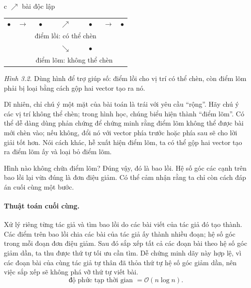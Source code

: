 \documentclass[11pt]{article}
\newcommand{\Oh}{\mathcal{O}}
\begin{document}
\begin{center}
\small
\begin{tabular}{c}
\(\nearrow\) bài độc lập\\[0.4em]
\begin{tabular}{ccccccc}
\(\bullet\) & \(\longrightarrow\) & \(\bullet\) & \(\nearrow\) &
\(\bullet\) & \(\longrightarrow\) & \(\bullet\)\\
 & & \multicolumn{3}{c}{điểm lồi: có thể chèn} & & \\
 & & & \(\searrow\) & \(\bullet\) & & \\
 & & \multicolumn{4}{c}{điểm lõm: không thể chèn} &
\end{tabular}
\end{tabular}

\textit{Hình 3.2.} Dùng hình để trợ giúp số: điểm lồi cho vị trí có thể chèn,
còn điểm lõm phải bị loại bằng cách gộp hai vector tạo ra nó.
\end{center}

Dĩ nhiên, chỉ chú ý một mặt của bài toán là trái với yêu cầu ``rộng''. Hãy
chú ý các vị trí không thể chèn; trong hình học, chúng biểu hiện thành
``điểm lõm''. Có thể dễ dàng dùng phản chứng để chứng minh rằng điểm lõm
không thể được bài mới chèn vào; nếu không, đổi nó với vector phía trước hoặc
phía sau sẽ cho lời giải tốt hơn. Nói cách khác, hễ xuất hiện điểm lõm, ta có
thể gộp hai vector tạo ra điểm lõm ấy và loại bỏ điểm lõm.

Hình nào không chứa điểm lõm? Đúng vậy, đó là bao lồi. Hệ số góc các cạnh trên
bao lồi lại vừa đúng là đơn điệu giảm. Có thể cảm nhận rằng ta chỉ còn cách
đáp án cuối cùng một bước.

\paragraph{Thuật toán cuối cùng.}
Xử lý riêng từng tác giả và tìm bao lồi do các bài viết của tác giả đó tạo
thành. Các điểm trên bao lồi chia các bài của tác giả ấy thành nhiều đoạn;
hệ số góc trong mỗi đoạn đơn điệu giảm. Sau đó sắp xếp tất cả các đoạn bài
theo hệ số góc giảm dần, ta thu được thứ tự tối ưu cần tìm. Dễ chứng minh dãy
này hợp lệ, vì các đoạn bài của cùng tác giả tự thân đã thỏa thứ tự hệ số góc
giảm dần, nên việc sắp xếp sẽ không phá vỡ thứ tự viết bài.
\[
  \text{độ phức tạp thời gian }=\Oh(n\log n).
\]
\end{document}
